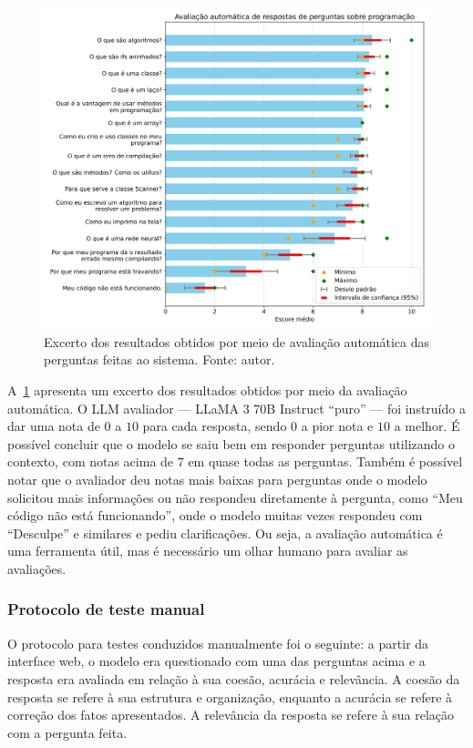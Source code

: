 \documentclass[journal]{IEEEtran}
\begin{document}
\begin{figure}[ht!]
    \centering
    \includegraphics[width=\textwidth]{media/scores2.pdf}
    \caption{Excerto dos resultados obtidos por meio de avaliação automática das perguntas feitas ao sistema. Fonte: autor.\label{fig:resultados_perguntas_subset}}
\end{figure}

A~\cref{fig:resultados_perguntas_subset} apresenta um excerto dos resultados obtidos por meio da avaliação automática.
O LLM avaliador --- LLaMA 3 70B Instruct ``puro'' --- foi instruído a dar uma nota de $0$ a $10$ para cada resposta, sendo $0$ a pior nota e $10$ a melhor.
É possível concluir que o modelo se saiu bem em responder perguntas utilizando o contexto, com notas acima de $7$ em quase todas as perguntas.
Também é possível notar que o avaliador deu notas mais baixas para perguntas onde o modelo solicitou mais informações ou não respondeu diretamente à pergunta, como ``Meu código não está funcionando'', onde o modelo muitas vezes respondeu com ``Desculpe'' e similares e pediu clarificações.
Ou seja, a avaliação automática é uma ferramenta útil, mas é necessário um olhar humano para avaliar as avaliações.

\subsubsection{Protocolo de teste manual}

\noindent%
O protocolo para testes conduzidos manualmente foi o seguinte: a partir da interface web, o modelo era questionado com uma das perguntas acima e a resposta era avaliada em relação à sua coesão, acurácia e relevância.
A coesão da resposta se refere à sua estrutura e organização, enquanto a acurácia se refere à correção dos fatos apresentados.
A relevância da resposta se refere à sua relação com a pergunta feita.
\end{document}
